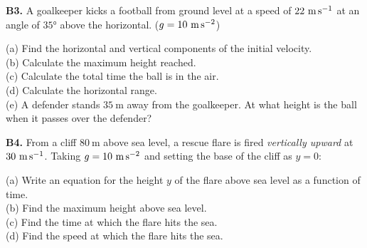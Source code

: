 \begin{exercisebox}[3]
\textbf{B3.} A goalkeeper kicks a football from ground
level at a speed of $22\ \text{m\,s}^{-1}$ at an angle
of $35°$ above the horizontal. ($g = 10\ \text{m\,s}^{-2}$)\\[4pt]
\begin{center}
\end{center}
(a) Find the horizontal and vertical components of the
initial velocity.\\
(b) Calculate the maximum height reached.\\
(c) Calculate the total time the ball is in the air.\\
(d) Calculate the horizontal range.\\
(e) A defender stands $35\ \text{m}$ away from the
goalkeeper. At what height is the ball when it passes
over the defender?
\hfill{}

\vspace{0.4cm}

\textbf{B4.} From a cliff $80\ \text{m}$ above sea level,
a rescue flare is fired \textit{vertically upward} at
$30\ \text{m\,s}^{-1}$. Taking $g = 10\ \text{m\,s}^{-2}$
and setting the base of the cliff as $y = 0$:
\begin{center}
\end{center}
(a) Write an equation for the height $y$ of the flare
above sea level as a function of time.\\
(b) Find the maximum height above sea level.\\
(c) Find the time at which the flare hits the sea.\\
(d) Find the speed at which the flare hits the sea.
\hfill{}


\end{exercisebox}
